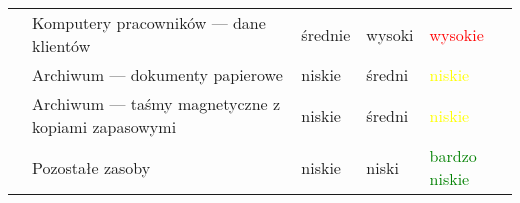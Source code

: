 \begin{landscape}
\begin{longtable}[!ht]{|m{4cm}|m{6cm}|m{4.5cm}|m{3cm}|m{3cm}|}
			& Komputery pracowników --- dane klientów & średnie & wysoki & \textcolor{red}{wysokie} \\ \cline{2-5} 
			& Archiwum --- dokumenty papierowe & niskie & średni & \textcolor{yellow}{niskie} \\ \cline{2-5} 
			& Archiwum --- taśmy magnetyczne z kopiami zapasowymi & niskie & średni & \textcolor{yellow}{niskie} \\ \cline{2-5}
			& Pozostałe zasoby &  niskie & niski & \textcolor{green}{bardzo niskie} \\ \cline{2-5}
		\hline
\end{longtable}
\end{landscape}


